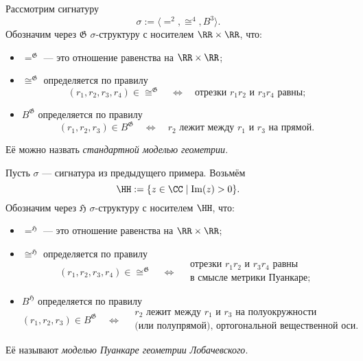 \documentclass[12pt,a4paper]{article}
\newcommand{\Img}{\ensuremath{\mathrm{Im}}\xspace}
\begin{document}
    \begin{example}
        Рассмотрим сигнатуру
        \[\sigma := \langle {=}^2, {\cong}^4, B^3 \rangle.\]
        \hypertarget{G-structure-definition}{}
        Обозначим через $\mathfrak{G}$ $\sigma$-структуру с носителем $\RR \times \RR$, что:
        \begin{itemize}
            \item ${=}^\mathfrak{G}$ --- это отношение равенства на $\RR \times \RR$;
            \item ${\cong}^\mathfrak{G}$ определяется по правилу
                \[
                    (r_1, r_2, r_3, r_4) \in {\cong}^\mathfrak{G}
                    \quad \Longleftrightarrow \quad
                    \text{отрезки $r_1r_2$ и $r_3r_4$ равны;}
                \]
            \item $B^\mathfrak{G}$ определяется по правилу
                \[
                    (r_1, r_2, r_3) \in B^\mathfrak{G}
                    \quad \Longleftrightarrow \quad
                    \text{$r_2$ лежит между $r_1$ и $r_3$ на прямой.}
                \]
        \end{itemize}
        Её можно назвать \emph{стандартной моделью геометрии}.
    \end{example}

    \begin{example}
        Пусть $\sigma$ --- сигнатура из предыдущего примера. Возьмём
        \[\HH := \{z \in \CC \mid \Img(z) > 0\}.\]
        \hypertarget{H-structure-definition}{}
        Обозначим через $\mathfrak{H}$ $\sigma$-структуру с носителем $\HH$, что:
        \begin{itemize}
            \item ${=}^\mathfrak{H}$ --- это отношение равенства на $\RR \times \RR$;
            \item ${\cong}^\mathfrak{H}$ определяется по правилу
                \[
                    (r_1, r_2, r_3, r_4) \in {\cong}^\mathfrak{G}
                    \quad \Longleftrightarrow \quad
                    \begin{gathered}
                        \text{отрезки $r_1r_2$ и $r_3r_4$ равны}\\
                        \text{в смысле метрики Пуанкаре;}                        
                    \end{gathered}
                \]
            \item $B^\mathfrak{H}$ определяется по правилу
                \[
                    (r_1, r_2, r_3) \in B^\mathfrak{G}
                    \quad \Longleftrightarrow \quad
                    \begin{gathered}
                        \text{$r_2$ лежит между $r_1$ и $r_3$ на полуокружности}\\
                        \text{(или полупрямой), ортогональной вещественной оси.}
                    \end{gathered}
                \]
        \end{itemize}
        Её называют \emph{моделью Пуанкаре геометрии Лобачевского}.
    \end{example}
\end{document}
